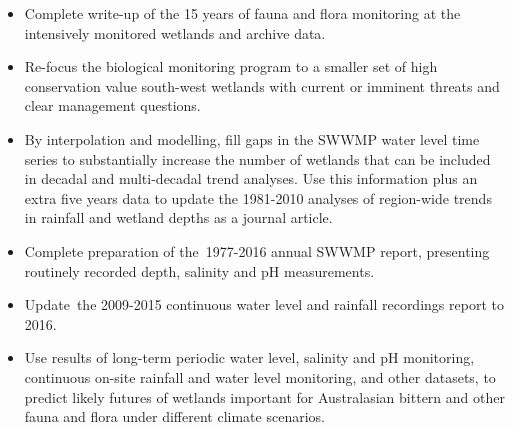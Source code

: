 \documentclass[version=last,
    paper=a4, %
    10pt, %
    usenames,
    dvipsnames,
    oneside, %
    headings=openany, %
    DIV=15 %
]{scrbook}
\begin{document}
\begin{itemize}
\itemsep1pt\parskip0pt
\item
  Complete write-up of the 15 years of fauna and flora monitoring at the
  intensively monitored wetlands and archive data.
\item
  Re-focus the biological monitoring program to a smaller set of high
  conservation value south-west wetlands with current or imminent
  threats and clear management questions.
\item
  By interpolation and modelling, fill gaps in the SWWMP water level
  time series to substantially increase the number of wetlands that can
  be included in decadal and multi-decadal trend analyses. Use this
  information plus an extra five years data to update the 1981-2010
  analyses of region-wide trends in rainfall and wetland depths as a
  journal article.
\item
  Complete preparation of the~1977-2016 annual SWWMP report, presenting
  routinely recorded depth, salinity and pH measurements.
\item
  Update~the 2009-2015 continuous water level and rainfall recordings
  report to 2016.
\item
  Use results of long-term periodic water level, salinity and pH
  monitoring, continuous on-site rainfall and water level monitoring,
  and other datasets, to predict likely futures of wetlands important
  for Australasian bittern and other fauna and flora under different
  climate scenarios.
\end{itemize}



\end{document}
